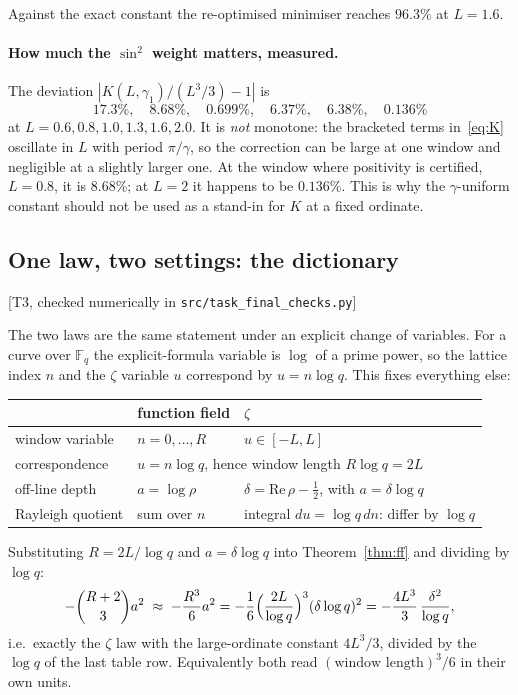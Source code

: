 \documentclass[11pt,a4paper]{article}
\theoremstyle{definition}
\theoremstyle{remark}
\newcommand{\tier}[1]{{\small\textsf{[#1]}}}
\newcommand{\Fq}{\mathbb{F}_q}
\newcommand{\src}[1]{{\footnotesize\texttt{#1}}}
\begin{document}
Against the exact constant the re-optimised minimiser reaches $96.3\%$ at $L=1.6$.

\paragraph{How much the $\sin^{2}$ weight matters, measured.} The deviation
$|K(L,\gamma_1)/(L^{3}/3)-1|$ is
\[
17.3\%,\quad 8.68\%,\quad 0.699\%,\quad 6.37\%,\quad 6.38\%,\quad 0.136\%
\]
at $L=0.6,0.8,1.0,1.3,1.6,2.0$. It is \emph{not} monotone: the bracketed terms
in~\eqref{eq:K} oscillate in $L$ with period $\pi/\gamma$, so the correction can be large at
one window and negligible at a slightly larger one. At the window where positivity is
certified, $L=0.8$, it is $8.68\%$; at $L=2$ it happens to be $0.136\%$. This is why the
$\gamma$-uniform constant should not be used as a stand-in for $K$ at a fixed ordinate.

\subsection{One law, two settings: the dictionary}\label{sec:dict}
\tier{T3, checked numerically in \src{src/task\_final\_checks.py}}

The two laws are the same statement under an explicit change of variables. For a curve over
$\Fq$ the explicit-formula variable is $\log$ of a prime power, so the lattice index $n$ and
the $\zeta$ variable $u$ correspond by $u=n\log q$. This fixes everything else:

\begin{center}
\begin{tabular}{@{}lll@{}}
\toprule
 & function field & $\zeta$ \\
\midrule
window variable & $n=0,\dots,R$ & $u\in[-L,L]$ \\
correspondence & \multicolumn{2}{l}{$u=n\log q$, hence window length $R\log q=2L$} \\
off-line depth & $a=\log\rho$ & $\delta=\mathrm{Re}\,\rho-\tfrac12$, with $a=\delta\log q$ \\
Rayleigh quotient & sum over $n$ & integral $du=\log q\,dn$: differ by $\log q$ \\
\bottomrule
\end{tabular}
\end{center}

Substituting $R=2L/\log q$ and $a=\delta\log q$ into Theorem~\ref{thm:ff} and dividing by
$\log q$:
\[
-\binom{R+2}{3}a^{2}\;\approx\;-\frac{R^{3}}{6}a^{2}
=-\frac{1}{6}\Bigl(\frac{2L}{\log q}\Bigr)^{3}(\delta\log q)^{2}
=-\frac{4L^{3}}{3}\,\frac{\delta^{2}}{\log q},
\]
i.e.\ exactly the $\zeta$ law with the large-ordinate constant $4L^{3}/3$, divided by the
$\log q$ of the last table row. Equivalently both read
$(\text{window length})^{3}/6$ in their own units.
\end{document}

